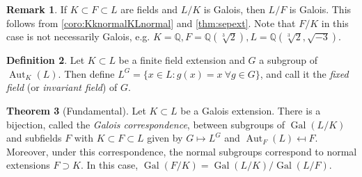\documentclass{article}
\newcommand{\Q}{\mathbb{Q}}
\newcommand{\Aut}{\operatorname{Aut}}
\newcommand{\Gal}{\operatorname{Gal}}
\theoremstyle{definition}
\newtheorem{defn}{Definition}[subsection]
\newtheorem{thm}[defn]{Theorem}
\newtheorem{remark}[defn]{Remark}
\begin{document}
\begin{remark}
If $K\subset F\subset L$ are fields and $L/K$ is Galois, then $L/F$ is Galois. This follows from \ref{coro:KknormalKLnormal} and \ref{thm:sepext}. Note that $F/K$ in this case is not necessarily Galois, e.g. $K=\Q,F=\Q(\sqrt[3]2),L=\Q(\sqrt[3]2,\sqrt{-3})$.
\end{remark}

\begin{defn}
Let $K\subset L$ be a finite field extension and $G$ a subgroup of $\Aut_K(L)$. Then define $L^G=\{x\in L:g(x)=x\ \forall g\in G\}$, and call it the \textit{fixed field} (or \textit{invariant field}) of $G$.
\end{defn}

\begin{thm}[Fundamental]
Let $K\subset L$ be a Galois extension. There is a bijection, called the \textit{Galois correspondence}, between subgroups of $\Gal(L/K)$ and subfields $F$ with $K\subset F\subset L$ given by $G\mapsto L^G$ and $\Aut_F(L)\mapsfrom F$. Moreover, under this correspondence, the normal subgroups correspond to normal extensions $F\supset K$. In this case, $\Gal(F/K)=\Gal(L/K)/\Gal(L/F)$.
\end{thm}
\end{document}
